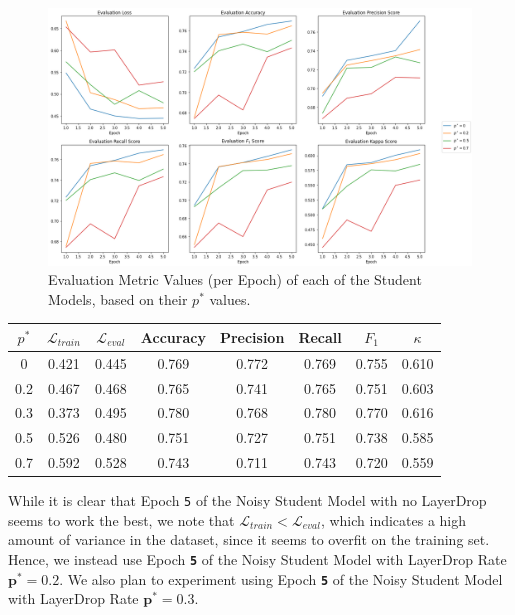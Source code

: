 \documentclass[12pt]{article}
\begin{document}
{\begin{figure}[!h]
    \begin{center}
        \includegraphics[scale=0.39]{images/metricslayerdrop.png}
        \caption{Evaluation Metric Values (per Epoch) of each of the Student Models, based on their $p^*$ values.}
        \label{fig:evaluationDropRate}
    \end{center}
\end{figure}
\begin{center}
\begin{tabular}{c|c c c c c c c}
     $p^*$ & $\mathcal{L}_{train}$ & $\mathcal{L}_{eval}$ & Accuracy & Precision & Recall & $F_1$ & $\kappa$ \\
     \hline 0 & 0.421 & 0.445 & 0.769 & 0.772 & 0.769 & 0.755 & 0.610 \\
     0.2 & 0.467 & 0.468 & 0.765 & 0.741 & 0.765 & 0.751 & 0.603 \\
     0.3 & 0.373 & 0.495 & 0.780 & 0.768 & 0.780 & 0.770 & 0.616 \\
     0.5 & 0.526 & 0.480 & 0.751 & 0.727 & 0.751 & 0.738 & 0.585 \\
     0.7 & 0.592 & 0.528 & 0.743 & 0.711 & 0.743 & 0.720 & 0.559
\end{tabular}
\label{dropratealtering}
\end{center}

While it is clear that Epoch \texttt{5} of the Noisy Student Model with no LayerDrop seems to work the best, we note that $\mathcal{L}_{train} < \mathcal{L}_{eval}$, which indicates a high amount of variance in the dataset, since it seems to overfit on the training set. Hence, we instead use Epoch \textbf{\texttt{5}} of the Noisy Student Model with LayerDrop Rate $\mathbf{p^* = 0.2}$. We also plan to experiment using Epoch \textbf{\texttt{5}} of the Noisy Student Model with LayerDrop Rate $\mathbf{p^* = 0.3}$.

}
\end{document}
